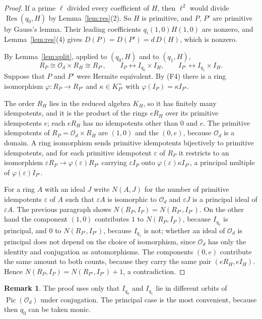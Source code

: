 \documentclass[11pt]{amsart}
\theoremstyle{definition}
\newtheorem{remark}[theorem]{Remark}
\newcommand{\OO}{\mathcal{O}}
\DeclareMathOperator{\Res}{Res}
\DeclareMathOperator{\Pic}{Pic}
\begin{document}
\begin{proof}
If a prime $\ell$ divided every coefficient of $H$, then $\ell^2$ would divide $\Res(q_0,H)$ by Lemma~\ref{lem:res}(2). So $H$ is primitive, and $P$, $P'$ are primitive by Gauss's lemma. Their leading coefficients $q_i(1,0)H(1,0)$ are nonzero, and Lemma~\ref{lem:res}(4) gives $D(P)=D(P')=d\,D(H)$, which is nonzero.

By Lemma~\ref{lem:split}, applied to $(q_0,H)$ and to $(q_1,H)$,
\[
R_P\cong\OO_d\times R_H\cong R_{P'},\qquad I_P\leftrightarrow I_{q_0}\times I_H,\qquad I_{P'}\leftrightarrow I_{q_1}\times I_H .
\]
Suppose that $P$ and $P'$ were Hermite equivalent. By (F4) there is a ring isomorphism $\varphi\colon R_P\to R_{P'}$ and $\kappa\in K_{P'}^\times$ with $\varphi(I_P)=\kappa I_{P'}$.

The order $R_H$ lies in the reduced algebra $K_H$, so it has finitely many idempotents, and it is the product of the rings $eR_H$ over its primitive idempotents $e$; each $eR_H$ has no idempotents other than $0$ and $e$. The primitive idempotents of $R_P=\OO_d\times R_H$ are $(1,0)$ and the $(0,e)$, because $\OO_d$ is a domain. A ring isomorphism sends primitive idempotents bijectively to primitive idempotents, and for each primitive idempotent $\varepsilon$ of $R_P$ it restricts to an isomorphism $\varepsilon R_P\to\varphi(\varepsilon)R_{P'}$ carrying $\varepsilon I_P$ onto $\varphi(\varepsilon)\kappa I_{P'}$, a principal multiple of $\varphi(\varepsilon)I_{P'}$.

For a ring $A$ with an ideal $J$ write $N(A,J)$ for the number of primitive idempotents $\varepsilon$ of $A$ such that $\varepsilon A$ is isomorphic to $\OO_d$ and $\varepsilon J$ is a principal ideal of $\varepsilon A$. The previous paragraph shows $N(R_P,I_P)=N(R_{P'},I_{P'})$. On the other hand the component $(1,0)$ contributes $1$ to $N(R_P,I_P)$, because $I_{q_0}$ is principal, and $0$ to $N(R_{P'},I_{P'})$, because $I_{q_1}$ is not; whether an ideal of $\OO_d$ is principal does not depend on the choice of isomorphism, since $\OO_d$ has only the identity and conjugation as automorphisms. The components $(0,e)$ contribute the same amount to both counts, because they carry the same pair $(eR_H,eI_H)$. Hence $N(R_P,I_P)=N(R_{P'},I_{P'})+1$, a contradiction.
\end{proof}

\begin{remark}\label{rem:class}
The proof uses only that $I_{q_0}$ and $I_{q_1}$ lie in different orbits of $\Pic(\OO_d)$ under conjugation. The principal case is the most convenient, because then $q_0$ can be taken monic.
\end{remark}
\end{document}

